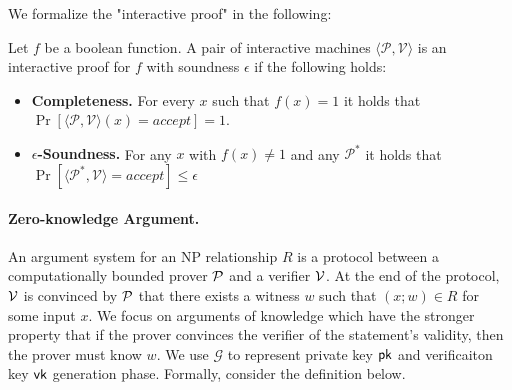 We formalize the "interactive proof" in the following:	
\begin{definition}\label{def:ip}
	Let $f$ be a boolean function. A pair of interactive machines $\langle\mathcal{P}, \mathcal{V}\rangle$ is an interactive proof for $f$ with soundness $\epsilon$ if the following holds:
	\begin{itemize}
		\item {\bf Completeness.} For every $x$ such that $f(x) = 1$ it holds that $\Pr[\langle\mathcal{P}, \mathcal{V}\rangle(x)=accept]=1$.
		\item {\bf $\epsilon$-Soundness.} For any $x$ with $f(x) \neq 1$ and any $\mathcal{P}^*$ it holds that $\Pr[\langle\mathcal{P^*},\mathcal{V}\rangle=accept] \le \epsilon$
	\end{itemize}
\end{definition}


\paragraph{Zero-knowledge Argument.} An argument system for an NP relationship $R$ is a protocol between a computationally bounded prover $\P$ and a verifier $\V$. At the end of the protocol, $\V$ is convinced by $\P$ that there exists a witness $w$ such that $(x; w) \in R$ for some input $x$. We focus on arguments of knowledge which have the stronger property that if the prover convinces the verifier of the statement’s validity, then the prover must know $w$. We use $\mathcal{G}$ to represent private key $\pk$ and verificaiton key $\vk$ generation phase. Formally, consider the definition below.

